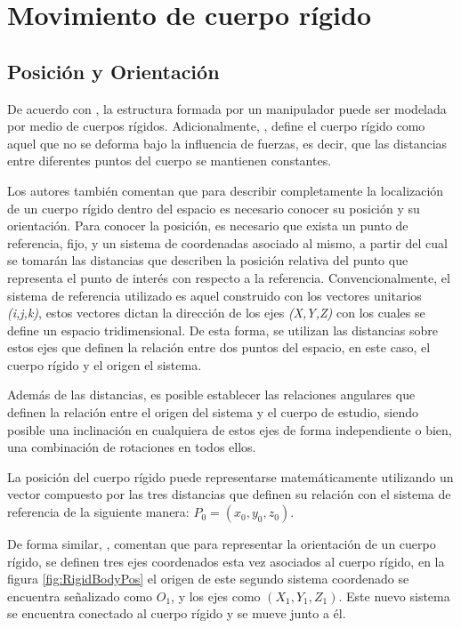 \section{Movimiento de cuerpo rígido}

\subsection{Posición y Orientación}
De acuerdo con \cite{asada_robot_1986}, la estructura formada por un manipulador puede ser modelada por medio de cuerpos rígidos. Adicionalmente, \cite{gross_statics_2013}, define el cuerpo rígido como aquel que no se deforma bajo la influencia de fuerzas, es decir, que las distancias entre diferentes puntos del cuerpo se mantienen constantes.

Los autores también comentan que para describir completamente la localización de un cuerpo rígido dentro del espacio es necesario conocer su posición y su orientación. Para conocer la posición, es necesario que exista un punto de referencia, fijo, y un sistema de coordenadas asociado al mismo, a partir del cual se tomarán las distancias que describen la posición relativa del punto que representa el punto de interés con respecto a la referencia. Convencionalmente, el sistema de referencia utilizado es aquel construido con los vectores unitarios \textit{(i,j,k)}, estos vectores dictan la dirección de los ejes \textit{(X,Y,Z)} con los cuales se define un espacio tridimensional. De esta forma, se utilizan las distancias sobre estos ejes que definen la relación entre dos puntos del espacio, en este caso, el cuerpo rígido y el origen el sistema. 

Además de las distancias, es posible establecer las relaciones angulares que definen la relación entre el origen del sistema y el cuerpo de estudio, siendo posible una inclinación en cualquiera de estos ejes de forma independiente o bien, una combinación de rotaciones en todos ellos. 

La posición del cuerpo rígido puede representarse matemáticamente utilizando un vector compuesto por las tres distancias que definen su relación con el sistema de referencia de la siguiente manera: $P_{0} = (x_{0},y_{0}, z_{0})$.

De forma similar, \cite{asada_robot_1986}, comentan que para representar la orientación de un cuerpo rígido, se definen tres ejes coordenados esta vez asociados al cuerpo rígido, en la figura \ref{fig:RigidBodyPos} el origen de este segundo sistema coordenado se encuentra señalizado como $O_{1}$, y los ejes como $(X_{1},Y_{1},Z_{1})$. Este nuevo sistema se encuentra conectado al cuerpo rígido y se mueve junto a él. 

